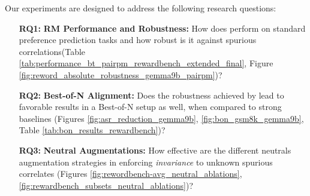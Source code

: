 \vspace{-0.1in}
Our experiments are designed to address the following research questions:
\label{list:research_questions}
\begin{itemize}[left=18pt,itemsep=0pt, topsep=0pt, parsep=0pt]
    \item[\textbf{RQ1:}] \textbf{RM Performance and Robustness:} How does \carma{} perform on standard preference prediction tasks and how robust is it against spurious correlations(Table \ref{tab:performance_bt_pairpm_rewardbench_extended_final}, Figure \ref{fig:reword_absolute_robustness_gemma9b_pairpm})? %

    \item[\textbf{RQ2:}] \textbf{Best-of-N Alignment:} Does the robustness achieved by \carma{} lead to favorable results in a Best-of-N setup as well, when compared to strong baselines (Figures \ref{fig:asr_reduction_gemma9b}, \ref{fig:bon_gsm8k_gemma9b}, Table \ref{tab:bon_results_rewardbench})? %
    
    \item[\textbf{RQ3:}] \textbf{Neutral Augmentations:} How effective are the different neutrals augmentation strategies in enforcing \textit{invariance} to unknown spurious correlates (Figures \ref{fig:rewordbench-avg_neutral_ablations}, \ref{fig:rewardbench_subsets_neutral_ablations})?
\end{itemize}





